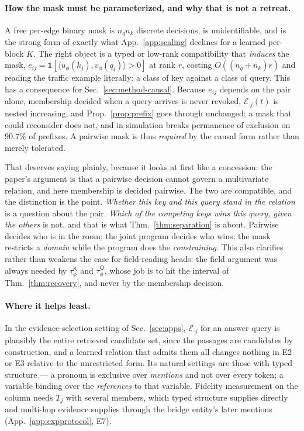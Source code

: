 \documentclass{article}
\newcommand{\tauK}{\tau^{\mathsf{K}}_\phi}
\newcommand{\tauQ}{\tau^{\mathsf{Q}}_\phi}
\begin{document}
\paragraph{How the mask must be parameterized, and why that is not a retreat.} A free per-edge
binary mask is $n_q n_k$ discrete decisions, is unidentifiable, and is the strong form of exactly
what App.~\ref{app:scaling} declines for a learned per-block $K$. The right object is a typed or
low-rank compatibility that \emph{induces} the mask,
$e_{ij}=\mathbf{1}[\langle u_\phi(k_j),v_\phi(q_i)\rangle>0]$ at rank $r$, costing
$O((n_q{+}n_k)r)$ and reading the traffic example literally: a class of key against a class of
query. This has a consequence for Sec.~\ref{sec:method-causal}. Because $e_{ij}$ depends on the
pair alone, membership decided when a query arrives is never revoked, $\mathcal{E}_{\cdot j}(t)$
is nested increasing, and Prop.~\ref{prop:prefix} goes through unchanged; a mask that could
reconsider does not, and in simulation breaks permanence of exclusion on $90.7\%$ of prefixes. A
pairwise mask is thus \emph{required} by the causal form rather than merely tolerated.

That deserves saying plainly, because it looks at first like a concession: the paper's argument
is that a pairwise decision cannot govern a multivariate relation, and here membership is decided
pairwise. The two are compatible, and the distinction is the point.
\emph{Whether this key and this query stand in the relation} is a question about the pair.
\emph{Which of the competing keys wins this query, given the others} is not, and that is what
Thm.~\ref{thm:separation} is about. Pairwise decides who is in the room; the joint program
decides who wins; the mask restricts a \emph{domain} while the program does the
\emph{constraining}. This also clarifies rather than weakens the case for field-reading heads:
the field argument was always needed by $\tauK$ and $\tauQ$, whose job is to hit the interval of
Thm.~\ref{thm:recovery}, and never by the membership decision.

\paragraph{Where it helps least.} In the evidence-selection setting of Sec.~\ref{sec:apps},
$\mathcal{E}_{\cdot j}$ for an answer query is plausibly the entire retrieved candidate set, since
the passages are candidates by construction, and a learned relation that admits them all changes
nothing in E2 or E3 relative to the unrestricted form. Its natural settings are those with typed
structure --- a pronoun is exclusive over \emph{mentions} and not over every token; a variable
binding over the \emph{references} to that variable. Fidelity measurement on the column needs
$T_j$ with several members, which typed structure supplies directly and multi-hop evidence
supplies through the bridge entity's later mentions (App.~\ref{app:expprotocol}, E7).
\end{document}
